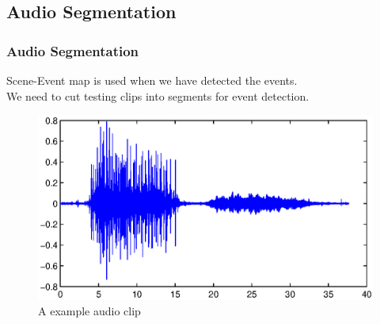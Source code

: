 \documentclass[xcolor=table,slidestop,compress,mathserif]{beamer}
\begin{document}
\subsection{Audio Segmentation}
\begin{frame}
	\frametitle{Audio Segmentation}	
	Scene-Event map is used when we have detected the events. \\ 
	We need to cut testing clips into segments for event detection. \\ 
	\pause 
	\begin{figure}
	\includegraphics[scale=0.5]{figure/tune_part.eps}
	\caption{A example audio clip}
	\end{figure}
\end{frame}
\end{document}
